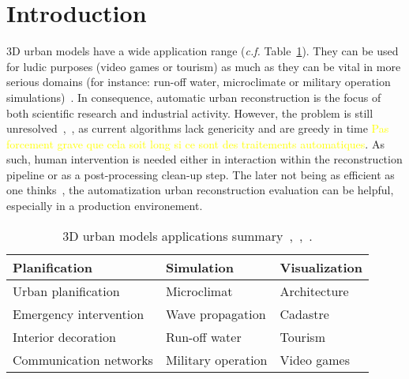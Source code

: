 \documentclass[runningheads]{llncs}
\begin{document}
\section{Introduction}
    3D urban models have a wide application range (\textit{c.f.} Table~\ref{tab::3d_applications}). They can be used for ludic purposes (video games or tourism) as much as they can be vital in more serious domains (for instance: run-off water, microclimate or military operation simulations)~\cite{Biljecki2015}. In consequence, automatic urban reconstruction is the focus of both scientific research and industrial activity. However, the problem is still unresolved~\cite{Musialski2012},~\cite{rottensteiner2014results}, as current algorithms lack genericity and are greedy in time \textcolor{yellow}{Pas forcement grave que cela soit long si ce sont des traitements automatiques}. As such, human intervention is needed either in interaction within the reconstruction pipeline or as a post-processing clean-up step. The later not being as efficient as one thinks~\cite{Musialski2012}, the automatization urban reconstruction evaluation can be helpful, especially in a production environement.
    \begin{table}[H]
        \begin{center}
            \begin{tabular}{l l l}
                \toprule
                Planification & Simulation & Visualization \\
                \midrule
                Urban planification & Microclimat & Architecture \\
                Emergency intervention & Wave propagation & Cadastre \\
                Interior decoration & Run-off water & Tourism \\
                Communication networks & Military operation & Video games \\
                \bottomrule
            \end{tabular}
            \caption{\label{tab::3d_applications} 3D urban models applications summary~\cite{Biljecki2015},~\cite{Scholze2002},~\cite{Wate2015}.}
        \end{center}
    \end{table}
\end{document}
